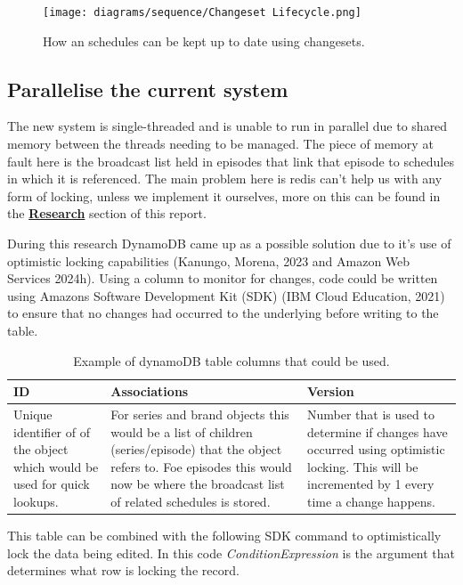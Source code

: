 \begin{figure}[H]
  \centering
  \texttt{[image: diagrams/sequence/Changeset Lifecycle.png]}
  \caption{How an schedules can be kept up to date using changesets.}
  \label{fig:changsetLifecycle}
\end{figure}

\newpage
\subsection{Parallelise the current system}
The new system is single-threaded and is unable to run in parallel due to shared memory between the threads needing to be managed. The piece of memory
at fault here is the broadcast list held in episodes that link that episode to schedules in which it is referenced. The main problem here is redis 
can't help us with any form of locking, unless we implement it ourselves, more on this can be found in the \hyperref[sec:storageSolutions]{\textbf{Research}}
section of this report.

During this research DynamoDB came up as a possible solution due to it's use of optimistic locking capabilities 
(Kanungo, Morena, 2023 and Amazon Web Services 2024h). Using a column to monitor for changes, code could be written using Amazons Software Development
Kit (SDK) (IBM Cloud Education, 2021) to ensure that no changes had occurred to the underlying before writing to the table. 

\begin{table}[H]
  \centering
  \begin{tabular}{|p{}|p{}|p{}|}
    \hline
    ID & Associations & Version \\ \hline
    Unique identifier of of the object which would be used for quick lookups. 
    & For series and brand objects this would be a list of children (series/episode) that the object refers to. Foe episodes this would now be 
    where the broadcast list of related schedules is stored.
    & Number that is used to determine if changes have occurred using optimistic locking. This will be incremented by 1 every time a change happens. \\ \hline
  \end{tabular}
  \caption{Example of dynamoDB table columns that could be used.}
\end{table}

This table can be combined with the following SDK command to optimistically lock the data being edited. In this code \emph{ConditionExpression} is 
the argument that determines what row is locking the record.


